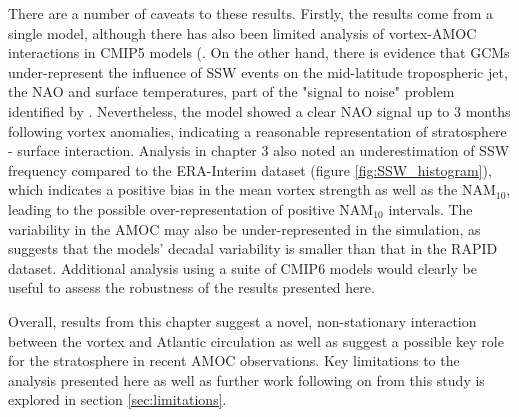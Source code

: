 There are a number of caveats to these results. Firstly, the results come from a single model, although there has also been limited analysis of vortex-AMOC interactions in CMIP5 models (\cite{reichlerStratospheric2012b}. On the other hand, there is evidence that GCMs under-represent the influence of SSW events on the mid-latitude tropospheric jet, the NAO and surface temperatures, part of the "signal to noise" problem identified by \cite{scaifeSignaltonoise2018b}. Nevertheless, the model showed a clear NAO signal up to 3 months following vortex anomalies, indicating a reasonable representation of stratosphere - surface interaction. Analysis in chapter 3 also noted an underestimation of SSW frequency compared to the ERA-Interim dataset (figure \ref{fig:SSW_histogram}), which indicates a positive bias in the mean vortex strength as well as the NAM$_{10}$, leading to the possible over-representation of positive NAM$_{10}$ intervals. The variability in the AMOC may also be under-represented in the simulation, as \cite{roberts20042014} suggests that the  models' decadal variability is smaller than that in the RAPID dataset. Additional analysis using a suite of CMIP6 models would clearly be useful to assess the robustness of the results presented here. 

Overall, results from this chapter suggest a novel, non-stationary interaction between the vortex and Atlantic circulation as well as suggest a possible key role for the stratosphere in recent AMOC observations. Key limitations to the analysis presented here as well as further work following on from this study is explored in section \ref{sec:limitations}.






